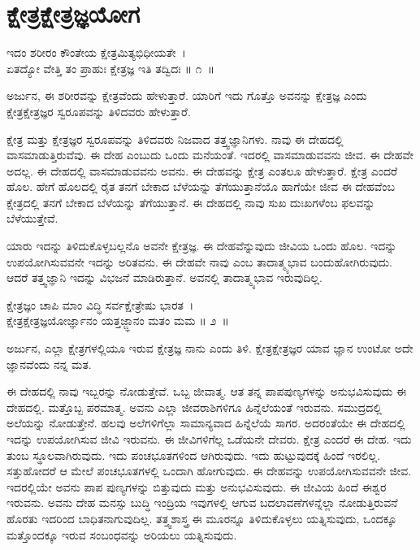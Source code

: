 
\chapter{ಕ್ಷೇತ್ರಕ್ಷೇತ್ರಜ್ಞಯೋಗ}

\begin{shloka}
ಇದಂ ಶರೀರಂ ಕೌಂತೇಯ ಕ್ಷೇತ್ರಮಿತ್ಯಭಿಧೀಯತೇ~।\\ಏತದ್ಯೋ ವೇತ್ತಿ ತಂ ಪ್ರಾಹುಃ ಕ್ಷೇತ್ರಜ್ಞ ಇತಿ ತದ್ವಿದಃ \hfill॥ ೧~॥
\end{shloka}

\begin{artha}
ಅರ್ಜುನ, ಈ ಶರೀರವನ್ನು ಕ್ಷೇತ್ರವೆಂದು ಹೇಳುತ್ತಾರೆ. ಯಾರಿಗೆ ಇದು ಗೊತ್ತೊ ಅವನನ್ನು ಕ್ಷೇತ್ರಜ್ಞ ಎಂದು ಕ್ಷೇತ್ರಕ್ಷೇತ್ರಜ್ಞರ ಸ್ವರೂಪವನ್ನು ತಿಳಿದವರು ಹೇಳುತ್ತಾರೆ.
\end{artha}

ಕ್ಷೇತ್ರ ಮತ್ತು ಕ್ಷೇತ್ರಜ್ಞರ ಸ್ವರೂಪವನ್ನು ತಿಳಿದವರು ನಿಜವಾದ ತತ್ತ್ವಜ್ಞಾನಿಗಳು. ನಾವು ಈ ದೇಹದಲ್ಲಿ ವಾಸಮಾಡುತ್ತಿರುವೆವು. ಈ ದೇಹ ಎಂಬುದು ಒಂದು ಮನೆಯಂತೆ. ಇದರಲ್ಲಿ ವಾಸಮಾಡುವವನು ಜೀವ. ಈ ದೇಹವೇ ಅದಲ್ಲ. ಈ ದೇಹದಲ್ಲಿ ವಾಸಮಾಡುವವನು ಅವನು. ಈ ದೇಹವನ್ನು ಕ್ಷೇತ್ರ ಎಂತಲೂ ಹೇಳುತ್ತಾರೆ. ಕ್ಷೇತ್ರ ಎಂದರೆ ಹೊಲ. ಹೇಗೆ ಹೊಲದಲ್ಲಿ ರೈತ ತನಗೆ ಬೇಕಾದ ಬೆಳೆಯನ್ನು ತೆಗೆಯುತ್ತಾನೆಯೊ ಹಾಗೆಯೇ ಜೀವ ಈ ದೇಹವೆಂಬ ಕ್ಷೇತ್ರದಲ್ಲಿ ತನಗೆ ಬೇಕಾದ ಬೆಳೆಯನ್ನು ತೆಗೆಯುತ್ತಾನೆ. ಈ ದೇಹದಲ್ಲಿ ನಾವು ಸುಖ ದುಃಖಗಳೆಂಬ ಫಲವನ್ನು ಬೆಳೆಯುತ್ತೇವೆ.

ಯಾರು ಇದನ್ನು ತಿಳಿದುಕೊಳ್ಳಬಲ್ಲನೊ ಅವನೇ ಕ್ಷೇತ್ರಜ್ಞ. ಈ ದೇಹವೆನ್ನುವುದು ಜೀವಿಯ ಒಂದು ಹೊಲ. ಇದನ್ನು ಉಪಯೋಗಿಸುವವನೇ ಇದನ್ನು ಅರಿತವನು. ಈ ದೇಹವೇ ನಾವು ಎಂಬ ತಾದಾತ್ಮ್ಯಭಾವ ಬಂದುಹೋಗಿರುವುದು. ಆದರೆ ತತ್ತ್ವಜ್ಞಾನಿ ಇದನ್ನು ವಿಭಜನೆ ಮಾಡಿರುತ್ತಾನೆ. ಅವನಲ್ಲಿ ತಾದಾತ್ಮ್ಯಭಾವ ಇರುವುದಿಲ್ಲ.

\begin{shloka}
ಕ್ಷೇತ್ರಜ್ಞಂ ಚಾಪಿ ಮಾಂ ವಿದ್ಧಿ ಸರ್ವಕ್ಷೇತ್ರೇಷು ಭಾರತ~।\\ಕ್ಷೇತ್ರಕ್ಷೇತ್ರಜ್ಞಯೋರ್ಜ್ಞಾನಂ ಯತ್ತಜ್ಜ್ಞಾನಂ ಮತಂ ಮಮ \hfill॥ ೨~॥
\end{shloka}

\begin{artha}
ಅರ್ಜುನ, ಎಲ್ಲಾ ಕ್ಷೇತ್ರಗಳಲ್ಲಿಯೂ ಇರುವ ಕ್ಷೇತ್ರಜ್ಞ ನಾನು ಎಂದು ತಿಳಿ. ಕ್ಷೇತ್ರಕ್ಷೇತ್ರಜ್ಞರ ಯಾವ ಜ್ಞಾನ ಉಂಟೋ ಅದೇ ಜ್ಞಾನವೆಂದು ನನ್ನ ಮತ.
\end{artha}

ಈ ದೇಹದಲ್ಲಿ ನಾವು ಇಬ್ಬರನ್ನು ನೋಡುತ್ತೇವೆ. ಒಬ್ಬ ಜೀವಾತ್ಮ. ಆತ ತನ್ನ ಪಾಪಪುಣ್ಯಗಳನ್ನು ಅನುಭವಿಸುವುದು ಈ ದೇಹದಲ್ಲಿ. ಮತ್ತೊಬ್ಬ ಪರಮಾತ್ಮ. ಅವನು ಎಲ್ಲಾ ಜೀವರಾಶಿ\-ಗಳಿಗೂ ಹಿನ್ನೆಲೆಯಂತೆ ಇರುವನು. ಸಮುದ್ರದಲ್ಲಿ ಅಲೆಯನ್ನು ನೋಡುತ್ತೇನೆ. ಹಲವು ಅಲೆಗಳಿಗೆಲ್ಲಾ ಸಾಮಾನ್ಯವಾದ ಹಿನ್ನೆಲೆಯೆ ಸಾಗರ. ಅದರಂತೆಯೇ ಈ ದೇಹದಲ್ಲಿ ಇದನ್ನು ಉಪಯೋಗಿಸುವ ಜೀವಿ ಇರುವನು. ಈ ಜೀವಿಗಳಿಗೆಲ್ಲ ಒಡೆಯನೇ ದೇವರು. ಕ್ಷೇತ್ರ ಎಂದರೆ ಈ ದೇಹ. ಇದು ತುಂಬ ಸ್ಥೂಲವಾಗಿರುವುದು. ಇದು ಪಂಚಭೂತಗಳಿಂದ ಆಗಿರುವುದು. ಇದು ಹುಟ್ಟುವುದಕ್ಕೆ ಹಿಂದೆ ಇರಲಿಲ್ಲ. ಸತ್ತುಹೋದರೆ ಆ ಮೇಲೆ ಪಂಚಭೂತಗಳಲ್ಲಿ ಒಂದಾಗಿ ಹೋಗುವುದು. ಈ ದೇಹವನ್ನು ಉಪಯೋಗಿಸುವವನೇ ಜೀವ. ಇದರಲ್ಲಿಯೇ ಅವನು ಪಾಪ ಪುಣ್ಯಗಳನ್ನು ಬಿತ್ತುವುದು ಮತ್ತು ಅನುಭವಿಸುವುದು. ಈ ಜೀವಿಯ ಹಿಂದೆ ಈಶ್ವರ ಇರುವನು. ಅವನು ದೇಹ ಮನಸ್ಸು ಬುದ್ಧಿ ಇಂದ್ರಿಯ ಇವುಗಳಲ್ಲಿ ಆಗುವ ಬದಲಾವಣೆಗಳನ್ನೆಲ್ಲಾ ನೋಡುತ್ತಿರುವನೆ ಹೊರತು ಇದರಿಂದ ಬಾಧಿತನಾಗುವುದಿಲ್ಲ. ತತ್ತ್ವಶಾಸ್ತ್ರ ಈ ಮೂರನ್ನೂ ತಿಳಿದುಕೊಳ್ಳಲು ಯತ್ನಿಸುವುದು, ಒಂದಕ್ಕೂ ಮತ್ತೊಂದಕ್ಕೂ ಇರುವ ಸಂಬಂಧವನ್ನು ಅರಿಯಲು ಯತ್ನಿಸುವುದು.

